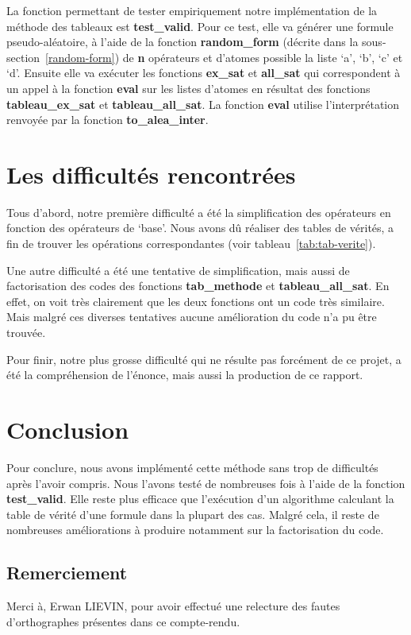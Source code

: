 \documentclass[12pt]{article}
\begin{document}
    La fonction permettant de tester empiriquement notre implémentation de la 
    méthode des tableaux est \textbf{test\_valid}. Pour ce test, elle va 
    générer une formule pseudo-aléatoire, à l'aide de la fonction 
    \textbf{random\_form} (décrite dans la sous-section~\ref{random-form}) de 
    \textbf{n} opérateurs et d'atomes possible la liste `a', `b', `c' et `d'. 
    Ensuite elle va exécuter les fonctions \textbf{ex\_sat} et \textbf{all\_sat} 
    qui correspondent à un appel à la fonction \textbf{eval} sur les listes 
    d'atomes en résultat des fonctions \textbf{tableau\_ex\_sat} et 
    \textbf{tableau\_all\_sat}. La fonction \textbf{eval} utilise 
    l'interprétation renvoyée par la fonction \textbf{to\_alea\_inter}.

    \newpage

    \section{Les difficultés rencontrées}

    Tous d'abord, notre première difficulté a été la simplification des 
    opérateurs en fonction des opérateurs de `base'. Nous avons dû réaliser des
    tables de vérités, a fin de trouver les opérations correspondantes (voir 
    tableau~\ref{tab:tab-verite}).

    Une autre difficulté a été une tentative de simplification, mais aussi de 
    factorisation des codes des fonctions \textbf{tab\_methode} et 
    \textbf{tableau\_all\_sat}. En effet, on voit très clairement que les deux 
    fonctions ont un code très similaire. Mais malgré ces diverses tentatives 
    aucune amélioration du code n'a pu être trouvée.  

    Pour finir, notre plus grosse difficulté qui ne résulte pas forcément de ce 
    projet, a été la compréhension de l'énonce, mais aussi la production de ce 
    rapport.
    
    \section{Conclusion}

    Pour conclure, nous avons implémenté cette méthode sans trop de difficultés
    après l'avoir compris. Nous l'avons testé de nombreuses fois à l'aide de la 
    fonction \textbf{test\_valid}. Elle reste plus efficace que l'exécution d'un 
    algorithme calculant la table de vérité d'une formule dans la plupart 
    des cas. Malgré cela, il reste de nombreuses améliorations à produire 
    notamment sur la factorisation du code.  
    
    \subsection{Remerciement}

    Merci à, Erwan LIEVIN, pour avoir effectué une relecture des fautes 
    d'orthographes présentes dans ce compte-rendu.
\end{document}
